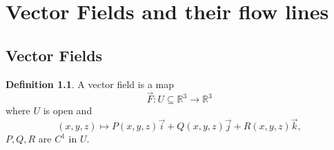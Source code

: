 \documentclass[12pt]{book}
\theoremstyle{definition}
\newtheorem{definition}{Definition}[section]
\theoremstyle{remark}
\begin{document}
    \chapter{Vector Fields and their flow lines}%
      \label{sub:Vector Fields and their flow lines (or integral lines)}
      \section{Vector Fields}%
        \label{sub:Vector Fields}
        
    \begin{definition}A vector field is a map $$\vec{{F}}: U \subseteq \mathbb{R}^3 \to \mathbb{R}^3 $$
      where $U$ is open and $$(x,y,z) \mapsto P(x,y,z)\vec{i} + Q(x,y,z)\vec{j} + R(x,y,z) \vec{k}, $$
      $P,Q,R $ are $C^1$ in $U$. 
      
    \end{definition} 
\end{document}
